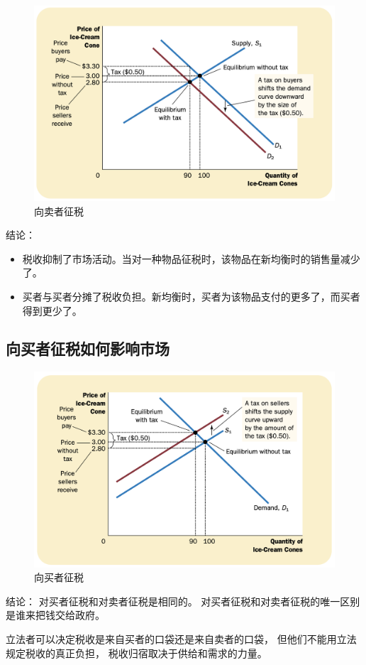 \begin{figure}[!ht]
  \centering
  \includegraphics[width=\textwidth]{pics/tax1}
  \caption{向卖者征税}
  \label{fig:tax1}
\end{figure}


结论：
\begin{itemize}
\item 税收抑制了市场活动。当对一种物品征税时，该物品在新均衡时的销售量减少了。
\item 买者与买者分摊了税收负担。新均衡时，买者为该物品支付的更多了，而买者得到更少了。
\end{itemize}




\subsection{向买者征税如何影响市场}


\begin{figure}[!ht]
  \centering
  \includegraphics[width=\textwidth]{pics/tax2}
  \caption{向买者征税}
  \label{fig:tax2}
\end{figure}

结论：
对买者征税和对卖者征税是相同的。
对买者征税和对卖者征税的唯一区别是谁来把钱交给政府。




立法者可以决定税收是来自买者的口袋还是来自卖者的口袋，
但他们不能用立法规定税收的真正负担，
税收归宿取决于供给和需求的力量。



